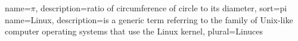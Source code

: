 \newpage


{
  name={\ensuremath{\pi}},
  description={ratio of circumference of circle to its
               diameter},
  sort=pi
}
{
  name=Linux,
  description={is a generic term referring to the family of Unix-like
               computer operating systems that use the Linux kernel},
  plural=Linuces
}
\printglossaries

\newpage